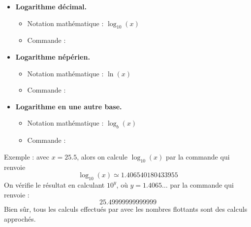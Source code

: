 \documentclass[11pt,class=report,crop=false]{standalone}
\begin{document}


\begin{cours}
\sauteligne



\begin{itemize}
  \item \textbf{Logarithme décimal.}
  \begin{itemize} 
    \item Notation mathématique : $\log_{10}(x)$
    \item Commande \Python{} : 
  \end{itemize}
  
   \item \textbf{Logarithme népérien.}
  \begin{itemize} 
    \item Notation mathématique : $\ln(x)$
    \item Commande \Python{} : 
  \end{itemize}
  
    \item \textbf{Logarithme en une autre base.}
  \begin{itemize} 
    \item Notation mathématique : $\log_b(x)$
    \item Commande \Python{} : 
  \end{itemize} 
   
\end{itemize}

Exemple : avec $x = 25.5$, alors on calcule $\log_{10}(x)$ par la commande
 qui renvoie 
$$\log_{10}(x) \simeq 1.406540180433955$$
On vérifie le résultat en calculant $10^y$, où $y=1.4065\ldots$ par la commande  qui renvoie :
$$25.49999999999999$$
Bien sûr, tous les calculs effectués par \Python{} avec les nombres flottants
sont des calculs approchés.
\end{cours}


\end{document}
